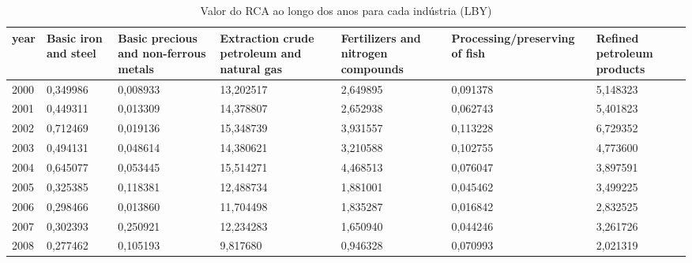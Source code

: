 \begin{table}
\centering
\caption{Valor do RCA ao longo dos anos para cada indústria (LBY)}
\begin{tabular}{p{1cm}p{2cm}p{2cm}p{2cm}p{2cm}p{2cm}p{2cm}}
\toprule
 year &  Basic iron and steel &  Basic precious and non-ferrous metals &  Extraction crude petroleum and natural gas &  Fertilizers and nitrogen compounds &  Processing/preserving of fish &  Refined petroleum products \\
\midrule
 2000 &              0,349986 &                               0,008933 &                                   13,202517 &                            2,649895 &                       0,091378 &                    5,148323 \\
 2001 &              0,449311 &                               0,013309 &                                   14,378807 &                            2,652938 &                       0,062743 &                    5,401823 \\
 2002 &              0,712469 &                               0,019136 &                                   15,348739 &                            3,931557 &                       0,113228 &                    6,729352 \\
 2003 &              0,494131 &                               0,048614 &                                   14,380621 &                            3,210588 &                       0,102755 &                    4,773600 \\
 2004 &              0,645077 &                               0,053445 &                                   15,514271 &                            4,468513 &                       0,076047 &                    3,897591 \\
 2005 &              0,325385 &                               0,118381 &                                   12,488734 &                            1,881001 &                       0,045462 &                    3,499225 \\
 2006 &              0,298466 &                               0,013860 &                                   11,704498 &                            1,835287 &                       0,016842 &                    2,832525 \\
 2007 &              0,302393 &                               0,250921 &                                   12,234283 &                            1,650940 &                       0,044246 &                    3,261726 \\
 2008 &              0,277462 &                               0,105193 &                                    9,817680 &                            0,946328 &                       0,070993 &                    2,021319 \\

\end{tabular}
\end{table}
